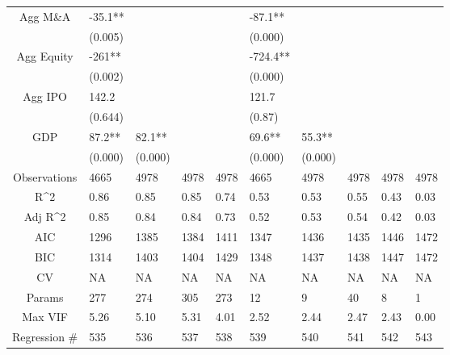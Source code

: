 \documentclass{article}
\begin{document}
\begin{table}[H]
\begin{tabular}{|clllllllll|}
  Agg M\&A & -35.1** &  &  &  & -87.1** &  &  &  &  \\ 
   & (0.005) &  &  &  & (0.000) &  &  &  &  \\ 
  Agg Equity & -261** &  &  &  & -724.4** &  &  &  &  \\ 
   & (0.002) &  &  &  & (0.000) &  &  &  &  \\ 
  Agg IPO & 142.2 &  &  &  & 121.7 &  &  &  &  \\ 
   & (0.644) &  &  &  & (0.87) &  &  &  &  \\ 
  GDP & 87.2** & 82.1** &  &  & 69.6** & 55.3** &  &  &  \\ 
   & (0.000) & (0.000) &  &  & (0.000) & (0.000) &  &  &  \\ 
  \hline 
 Observations & 4665 & 4978 & 4978 & 4978 & 4665 & 4978 & 4978 & 4978 & 4978 \\ 
  R^2 & 0.86 & 0.85 & 0.85 & 0.74 & 0.53 & 0.53 & 0.55 & 0.43 & 0.03 \\ 
  Adj R^2 & 0.85 & 0.84 & 0.84 & 0.73 & 0.52 & 0.53 & 0.54 & 0.42 & 0.03 \\ 
  AIC & 1296 & 1385 & 1384 & 1411 & 1347 & 1436 & 1435 & 1446 & 1472 \\ 
  BIC & 1314 & 1403 & 1404 & 1429 & 1348 & 1437 & 1438 & 1447 & 1472 \\ 
  CV & NA & NA & NA & NA & NA & NA & NA & NA & NA \\ 
  Params & 277 & 274 & 305 & 273 & 12 & 9 & 40 & 8 & 1 \\ 
  Max VIF & 5.26 & 5.10 & 5.31 & 4.01 & 2.52 & 2.44 & 2.47 & 2.43 & 0.00 \\ 
  Regression \# & 535 & 536 & 537 & 538 & 539 & 540 & 541 & 542 & 543 \\ 
   \hline
\end{tabular}
 
\end{table}
\end{document}
